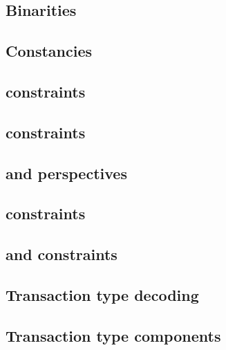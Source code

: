 \subsection{Binarities}                              \label{rlp txn v2: generalities: binarities}                         
\subsection{Constancies}                             \label{rlp txn v2: generalities: constancies}                        
\subsection{\userTransactionNumber{} constraints}    \label{rlp txn v2: generalities: user transaction number}            
\subsection{\locPhaseFlagSum{} constraints}          \label{rlp txn v2: generalities: phase flag sum}                     
\subsection{\locPerspFlagSum{} and perspectives}     \label{rlp txn v2: generalities: perspectives}                       
\subsection{\phaseEnd{} constraints}                 \label{rlp txn v2: generalities: PHASE_END constraints}              
\subsection{\ct{} and \maxCt{} constraints}          \label{rlp txn v2: generalities: ct and ct_max}                      
\subsection{Transaction type decoding}               \label{rlp txn v2: generalities: transaction decoding}               
\subsection{Transaction type \rlp{} components}      \label{rlp txn v2: generalities: transaction type rlp components}    
